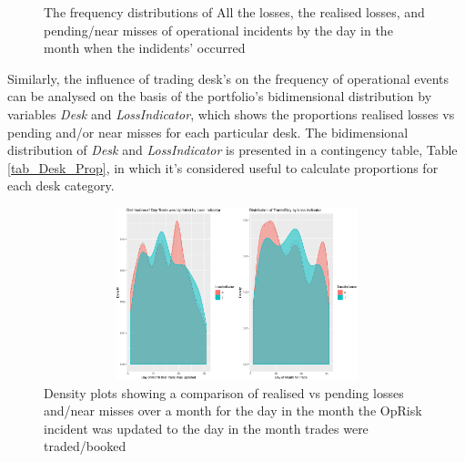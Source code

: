\documentclass{DissertateUSU}
\begin{document}
\begin{figure}
\caption[Two numerical solutions: Histograms showing the distribution of UpdatedTime \& UpdatedDay by LossIndicator.]{The frequency distributions of All the losses, the realised losses, and pending/near misses of operational incidents by the day in the month when the indidents' occurred}
\label{Exploratory_Time_Day_Frequency3plot}
\end{figure}

Similarly, the influence of trading desk's on the frequency of
operational events can be analysed on the basis of the portfolio's
bidimensional distribution by variables \emph{Desk} and
\emph{LossIndicator}, which shows the proportions realised losses vs
pending and/or near misses for each particular desk. The bidimensional
distribution of \emph{Desk} and \emph{LossIndicator} is presented in a
contingency table, Table \ref{tab_Desk_Prop}, in which it's considered
useful to calculate proportions for each desk category.

\begin{figure}
\centering
\includegraphics[width=15cm,height=5cm]{Density_UpdateDay_TradedDay.eps}
\caption[Density plots showing a comparison of realised vs pending losses and/near misses over a month for the day in the month the OpRisk incident was updated to the day in the month trades were traded/booked]{Density plots showing a comparison of realised vs pending losses and/near misses over a month for the day in the month the OpRisk incident was updated to the day in the month trades were traded/booked}
\label{Desk_Proportions}
\end{figure}

\singlespacing

\doublespacing
\end{document}
